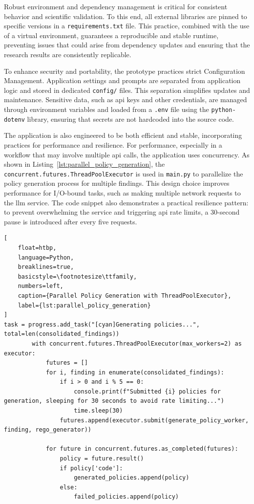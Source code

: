 Robust environment and dependency management is critical for consistent behavior and scientific validation. To this end, all external libraries are pinned to specific versions in a \texttt{requirements.txt} file. This practice, combined with the use of a virtual environment, guarantees a reproducible and stable runtime, preventing issues that could arise from dependency updates and ensuring that the research results are consistently replicable.

To enhance security and portability, the prototype practices strict Configuration Management. Application settings and prompts are separated from application logic and stored in dedicated \texttt{config/} files. This separation simplifies updates and maintenance. Sensitive data, such as \gls{api} keys and other credentials, are managed through environment variables and loaded from a \texttt{.env} file using the \texttt{python-dotenv} library, ensuring that secrets are not hardcoded into the source code.

The application is also engineered to be both efficient and stable, incorporating practices for performance and resilience. For performance, especially in a workflow that may involve multiple \gls{api} calls, the application uses concurrency. As shown in Listing~\ref{lst:parallel_policy_generation}, the \texttt{concurrent.futures.ThreadPoolExecutor} is used in \texttt{main.py} to parallelize the policy generation process for multiple findings. This design choice improves performance for I/O-bound tasks, such as making multiple network requests to the \gls{llm} service. The code snippet also demonstrates a practical resilience pattern: to prevent overwhelming the service and triggering \gls{api} rate limits, a 30-second pause is introduced after every five requests.

\begin{lstlisting}[
    float=htbp,
    language=Python, 
    breaklines=true, 
    basicstyle=\footnotesize\ttfamily, 
    numbers=left,
    caption={Parallel Policy Generation with ThreadPoolExecutor},
    label={lst:parallel_policy_generation}
]
task = progress.add_task("[cyan]Generating policies...", total=len(consolidated_findings))
        with concurrent.futures.ThreadPoolExecutor(max_workers=2) as executor:
            futures = []
            for i, finding in enumerate(consolidated_findings):
                if i > 0 and i % 5 == 0:
                    console.print(f"Submitted {i} policies for generation, sleeping for 30 seconds to avoid rate limiting...")
                    time.sleep(30)
                futures.append(executor.submit(generate_policy_worker, finding, rego_generator))

            for future in concurrent.futures.as_completed(futures):
                policy = future.result()
                if policy['code']:
                    generated_policies.append(policy)
                else:
                    failed_policies.append(policy)
\end{lstlisting}

